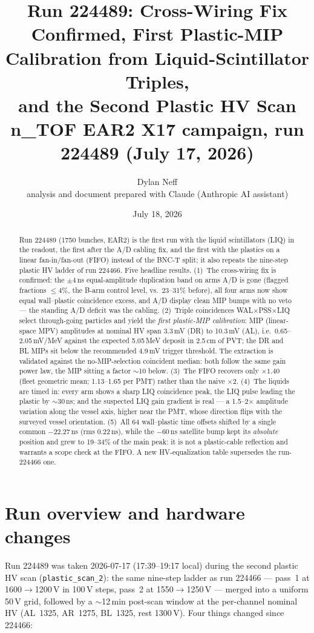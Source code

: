 \documentclass[11pt]{article}
\title{Run 224489: Cross-Wiring Fix Confirmed, First Plastic-MIP Calibration
       from Liquid-Scintillator Triples,\\ and the Second Plastic HV Scan\\
       \large n\_TOF EAR2 X17 campaign, run 224489 (July 17, 2026)}
\author{Dylan Neff \\[0.5ex] {\small analysis and document prepared with Claude (Anthropic AI assistant)}}
\date{July 18, 2026}
\begin{document}
\maketitle

\begin{abstract}
Run 224489 (1750 bunches, EAR2) is the first run with the liquid scintillators
(LIQ) in the readout, the first after the A/D cabling fix, and the first with
the plastics on a linear fan-in/fan-out (FIFO) instead of the BNC-T split; it
also repeats the nine-step plastic HV ladder of run 224466. Five headline
results. (1)~The cross-wiring fix is confirmed: the $\pm4$\,ns equal-amplitude
duplication band on arms A/D is gone (flagged fractions $\leq$4\%, the B-arm
control level, vs.\ 23--31\% before), all four arms now show equal wall--plastic
coincidence excess, and A/D display clean MIP bumps with no veto --- the
standing A/D deficit was the cabling. (2)~Triple coincidences
WAL$\times$PSS$\times$LIQ select through-going particles and yield the
\emph{first plastic-MIP calibration}: MIP (linear-space MPV) amplitudes at
nominal HV span 3.3\,mV (DR) to 10.3\,mV (AL), i.e.\ 0.65--2.05\,mV/MeV
against the expected 5.05\,MeV deposit in 2.5\,cm of PVT; the DR and BL MIPs
sit below the recommended 4.9\,mV trigger threshold. The extraction is
validated against the no-MIP-selection coincident median: both follow the
same gain power law, the MIP sitting a factor $\sim$10 below. (3)~The FIFO recovers only
$\times1.40$ (fleet geometric mean; 1.13--1.65 per PMT) rather than the naive
$\times2$. (4)~The liquids are timed in: every arm shows a sharp LIQ
coincidence peak, the LIQ pulse leading the plastic by $\sim$30\,ns; and the
suspected LIQ gain gradient is real --- a 1.5--2$\times$ amplitude variation
along the vessel axis, higher near the PMT, whose direction flips with the
surveyed vessel orientation. (5)~All 64 wall--plastic time offsets shifted by
a single common $-22.27$\,ns (rms 0.22\,ns), while the $-60$\,ns satellite
bump kept its \emph{absolute} position and grew to 19--34\% of the main peak:
it is not a plastic-cable reflection and warrants a scope check at the FIFO.
A new HV-equalization table supersedes the run-224466 one.
\end{abstract}

\section{Run overview and hardware changes}
Run 224489 was taken 2026-07-17 (17:39--19:17 local) during the second
plastic HV scan (\texttt{plastic\_scan\_2}): the same nine-step ladder as
run 224466 --- pass~1 at 1600$\to$1200\,V in 100\,V steps, pass~2 at
1550$\to$1250\,V --- merged into a uniform 50\,V grid, followed by a
$\sim$12\,min post-scan window at the per-channel nominal HV
(AL~1325, AR~1275, BL~1325, rest 1300\,V). Four things changed since 224466:
\end{document}
